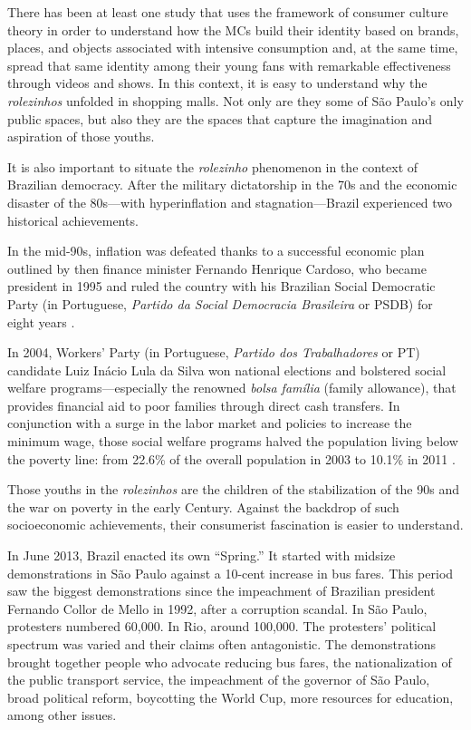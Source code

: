 There has been at least one study \autocite{abdalla_2014_rolezinho} that uses the framework of consumer culture theory in order to understand how the MCs build their identity based on brands, places, and objects associated with intensive consumption and, at the same time, spread that same identity among their young fans with remarkable effectiveness through videos and shows. In this context, it is easy to understand why the \emph{rolezinhos} unfolded in shopping malls. Not only are they some of São Paulo’s only public spaces, but also they are the spaces that capture the imagination and aspiration of those youths. 

It is also important to situate the \emph{rolezinho} phenomenon in the context of Brazilian democracy. After the military dictatorship in the 70s and the economic disaster of the 80s---with hyperinflation and stagnation---Brazil experienced two historical achievements.

In the mid-90s, inflation was defeated thanks to a successful economic plan outlined by then finance minister Fernando Henrique Cardoso, who became president in 1995 and ruled the country with his Brazilian Social Democratic Party (in Portuguese, \emph{Partido da Social Democracia Brasileira} or PSDB) for eight years \autocite{TWEC:TWEC472}.

In 2004, Workers' Party (in Portuguese, \emph{Partido dos Trabalhadores} or PT) candidate Luiz Inácio Lula da Silva won national elections and bolstered social welfare programs---especially the renowned \emph{bolsa família} (family allowance), that provides financial aid to poor families through direct cash transfers. In conjunction with a surge in the labor market and policies to increase the minimum wage, those social welfare programs halved the population living below the poverty line: from 22.6\% of the overall population in 2003 to 10.1\% in 2011 \autocite{rocha2012pobreza}.

Those youths in the \emph{rolezinhos} are the children of the stabilization of the 90s and the war on poverty in the early  Century. Against the backdrop of such socioeconomic achievements, their consumerist fascination is easier to understand.

In June 2013, Brazil enacted its own \enquote{Spring.} It started with midsize demonstrations in São Paulo against a 10-cent increase in bus fares. This period saw the biggest demonstrations since the impeachment of Brazilian president Fernando Collor de Mello in 1992, after a corruption scandal. In São Paulo, protesters numbered 60,000. In Rio, around 100,000. The protesters' political spectrum was varied and their claims often antagonistic. The demonstrations brought together people who advocate reducing bus fares, the nationalization of the public transport service, the impeachment of the governor of São Paulo, broad political reform, boycotting the World Cup, more resources for education, among other issues.

